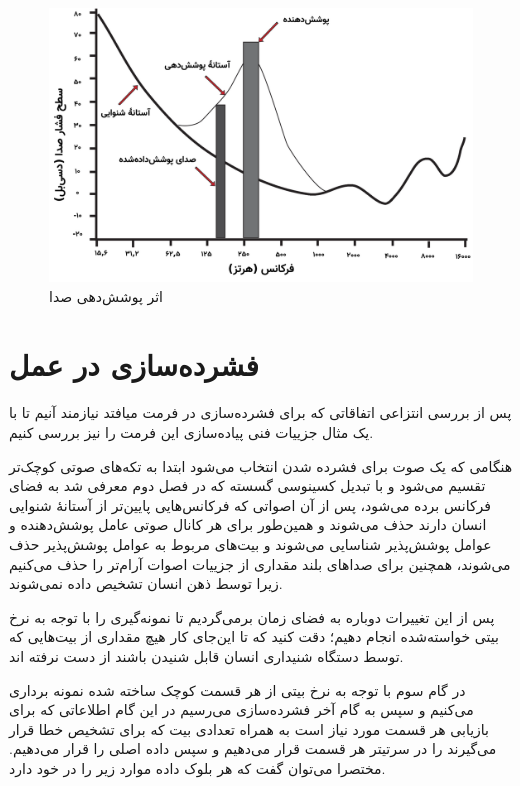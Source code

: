  \begin{figure}[]
         \centering
         \includegraphics[width=\textwidth]{figs/masking_effect.png}
         \caption[اثر پوشش‌دهی صدا]{اثر پوشش‌دهی صدا \cite{audio_masking}}
         \label{masking_effect}
 \end{figure}

 \section{فشرده‌سازی  در عمل}

 پس از بررسی انتزاعی اتفاقاتی که برای فشرده‌سازی در فرمت  میافتد نیازمند آنیم تا 
 با یک مثال جزییات فنی پیاده‌سازی این فرمت را نیز بررسی کنیم. 

 هنگامی که یک صوت برای فشرده‌ شدن انتخاب می‌شود ابتدا به تکه‌های صوتی کوچک‌تر تقسیم می‌شود و با تبدیل کسینوسی گسسته که در فصل 
 دوم معرفی شد به فضای فرکانس برده می‌شود، پس از آن اصواتی که فرکانس‌هایی پایین‌تر از آستانهٔ شنوایی انسان دارند حذف می‌شوند و همین‌طور برای
 هر کانال صوتی عامل پوشش‌دهنده   و عوامل پوشش‌پذیر 
 شناسایی می‌شوند و بیت‌های مربوط به عوامل پوشش‌پذیر حذف می‌شوند، همچنین برای صداهای بلند مقداری از جزییات اصوات آرام‌تر را حذف می‌کنیم زیرا
 توسط ذهن انسان تشخیص داده نمی‌شوند. 

  پس از این تغییرات دوباره به فضای زمان برمی‌گردیم تا نمونه‌گیری را با توجه به 
 نرخ بیتی خواسته‌شده انجام دهیم؛ دقت کنید که تا این‌جای کار هیچ مقداری از بیت‌هایی که توسط دستگاه شنیداری انسان قابل شنیدن باشند از دست نرفته اند.

 در گام سوم با توجه به نرخ بیتی از هر قسمت کوچک ساخته شده نمونه برداری می‌کنیم و سپس به گام آخر فشرده‌سازی می‌رسیم
 در این گام اطلاعاتی که برای بازیابی هر قسمت مورد نیاز است به همراه تعدادی بیت که برای تشخیص خطا قرار می‌گیرند را در سرتیتر
 هر قسمت قرار می‌دهیم و سپس داده اصلی را قرار می‌دهیم. مختصرا می‌توان گفت که هر بلوک داده موارد زیر را در خود دارد. 

